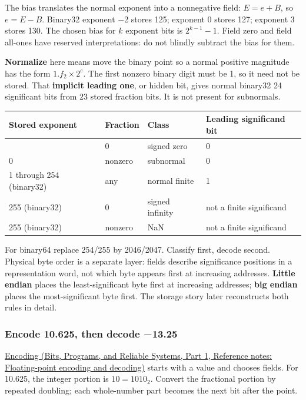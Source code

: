 The bias translates the normal exponent into a nonnegative field: \(E=e+B\), so \(e=E-B\). Binary32 exponent −2 stores 125; exponent 0 stores 127; exponent 3 stores 130. The chosen bias for \(k\) exponent bits is \(2^{k-1}-1\). Field zero and field all-ones have reserved interpretations: do not blindly subtract the bias for them.

\textbf{Normalize} here means move the binary point so a normal positive magnitude has the form \(1.f_2\times2^e\). The first nonzero binary digit must be 1, so it need not be stored. That \textbf{implicit leading one}, or hidden bit, gives normal binary32 24 significant bits from 23 stored fraction bits. It is not present for subnormals.

{\def\LTcaptype{none} %
\begin{longtable}[]{@{}llll@{}}
\toprule\noalign{}
Stored exponent & Fraction & Class & Leading significand bit \\
\midrule\noalign{}
\endhead
\bottomrule\noalign{}
\endlastfoot
0 & 0 & signed zero & 0 \\
0 & nonzero & subnormal & 0 \\
1 through 254 (binary32) & any & normal finite & 1 \\
255 (binary32) & 0 & signed infinity & not a finite significand \\
255 (binary32) & nonzero & NaN & not a finite significand \\
\end{longtable}
}

For binary64 replace 254/255 by 2046/2047. Classify first, decode second. Physical byte order is a separate layer: fields describe significance positions in a representation word, not which byte appears first at increasing addresses. \textbf{Little endian} places the least-significant byte first at increasing addresses; \textbf{big endian} places the most-significant byte first. The storage story later reconstructs both rules in detail.

\subsubsection{Encode 10.625, then decode −13.25}\label{05-engine-i-ch001-encode-10.625-then-decode-13.25}

\hypertarget{05-engine-i-ch001-encode-10.625-then-decode-13.25}{}

\href{../01-Bits-Programs-and-Reliable-Systems-P01/main.pdf\#appendix-6854d0e2218e}{Encoding (Bits, Programs, and Reliable Systems, Part 1, Reference notes: Floating-point encoding and decoding)} starts with a value and chooses fields. For 10.625, the integer portion is \(10=1010_2\). Convert the fractional portion by repeated doubling; each whole-number part becomes the next bit after the point.

